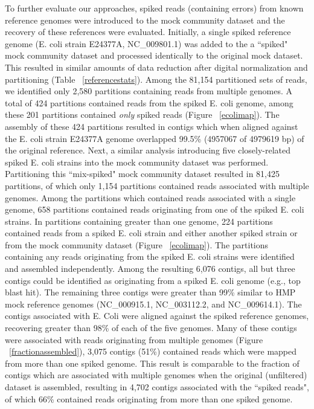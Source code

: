 \documentclass[11pt]{article} %
\begin{document}
To further evaluate our approaches, spiked reads (containing errors) from known reference genomes were introduced to the mock community dataset and the recovery of these references were evaluated.  Initially, a single  spiked reference genome (E. coli strain E24377A, NC\_009801.1) was added to the  a ``spiked" mock community dataset and processed identically to the original mock dataset.  This resulted in similar amounts of data reduction after digital normalization and partitioning (Table ~\ref{referencestats}).  Among the 81,154 partitioned sets of reads, we identified only 2,580 partitions containing reads from multiple genomes.  A total of 424 partitions contained reads from the spiked E. coli genome, among these 201 partitions contained \emph{only} spiked reads (Figure ~\ref{ecolimap}).  The assembly of these 424 partitions resulted in contigs which when aligned against the E. coli strain E24377A genome overlapped 99.5\% (4957067 of 4979619 bp) of the original reference.  Next, a similar analysis introducing five closely-related spiked E. coli strains into the mock community dataset was  performed.  Partitioning this ``mix-spiked" mock community dataset resulted in 81,425 partitions, of which only 1,154 partitions contained reads associated with multiple genomes.  Among the partitions which contained reads associated with a single genome, 658 partitions contained reads originating from one of the spiked E. coli strains.  In partitions containing greater than one genome, 224 partitions contained reads from a spiked E. coli strain and either another spiked strain or from the mock community dataset (Figure ~\ref{ecolimap}).  The partitions containing any reads originating from the spiked E. coli strains were identified and assembled independently.  Among the resulting 6,076 contigs, all but three contigs could be identified as originating from a spiked E. coli genome (e.g., top blast hit).  The remaining three contigs were greater than 99\% similar to HMP mock reference genomes (NC\_000915.1, NC\_003112.2, and NC\_009614.1).  The contigs associated with E. Coli were aligned against the spiked reference genomes, recovering greater than 98\% of each of the five genomes.  Many of these contigs were associated with reads originating from multiple genomes (Figure ~\ref{fractionassembled}), 3,075 contigs (51\%) contained reads which were mapped from more than one spiked genome.  This result is comparable to the fraction of contigs which are associated with multiple genomes when the original (unfiltered) dataset is assembled, resulting in 4,702 contigs associated with the ``spiked reads", of which 66\% contained reads originating from more than one spiked genome.
\end{document}
